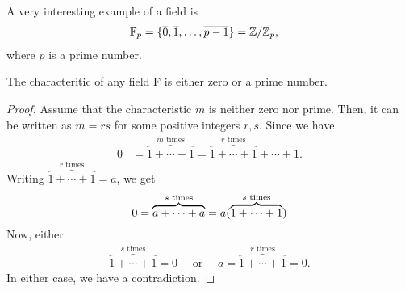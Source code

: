 A very interesting example of a field is 
\begin{align*}
    \mathbb{F}_p &= \{\overline 0, \overline 1 ,\dotsc, \overline {p-1}\} = \mathbb{Z}/\mathbb{Z}_p,
\end{align*}
where $p$ is a prime number. 
\begin{lemma}
   The characteritic of any field F is either zero or a prime number. 
\end{lemma}
\begin{proof}
   Assume that the characteristic $m$ is neither zero nor prime. Then, it can be written as $m=rs$ for some positive integers $r,s$. Since we have
   \begin{align*}
        0 &= \overbrace{1 + \cdots + 1}^{m \text{ times}} 
        = \overbrace{1 + \cdots + 1}^{r \text{ times}}  + \cdots  +1 .
   \end{align*}
   Writing $\overbrace{1 + \cdots + 1}^{r \text{ times}}=a$, we get 
   \begin{equation*}
        0 = \overbrace{a + \cdots + a}^{s \text{ times}} 
        = a (\overbrace{1 + \cdots + 1}^{s \text{ times}}) \\
   \end{equation*}
   Now, either 
   \begin{align*}
        \overbrace{1 + \cdots + 1}^{s \text{ times}} = 0 \quad \text{ or }\quad
        a = \overbrace{1 + \cdots + 1}^{r \text{ times}} =0.
   \end{align*}
   In either case, we have a contradiction.
\end{proof}




